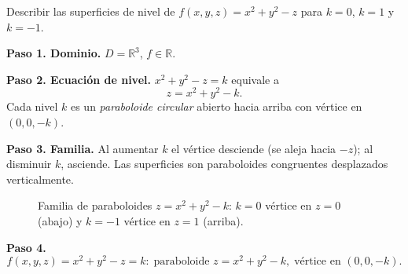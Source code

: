 \begin{example}
Describir las superficies de nivel de $f(x,y,z) = x^2+y^2-z$ para
$k=0$, $k=1$ y $k=-1$.
\begin{myproof}
\textbf{Paso 1. Dominio.} $D=\mathbb{R}^3$, $f\in\mathbb{R}$.

\textbf{Paso 2. Ecuación de nivel.} $x^2+y^2-z=k$ equivale a
\[
z = x^2+y^2-k.
\]
Cada nivel $k$ es un \emph{paraboloide circular} abierto hacia arriba
con vértice en $(0,0,-k)$.

\textbf{Paso 3. Familia.} Al aumentar $k$ el vértice desciende (se
aleja hacia $-z$); al disminuir $k$, asciende. Las superficies son
paraboloides congruentes desplazados verticalmente.

\begin{figure}[H]
\centering
{}
\caption{Familia de paraboloides $z=x^2+y^2-k$: $k=0$ vértice en $z=0$ (abajo) y
         $k=-1$ vértice en $z=1$ (arriba).}
\label{fig:nivel_paraboloides}
\end{figure}

\textbf{Paso 4.}
\[\boxed{f(x,y,z)=x^2+y^2-z=k:\;\text{paraboloide }z=x^2+y^2-k,
\;\text{vértice en }(0,0,-k).}\]
\end{myproof}
\end{example}

